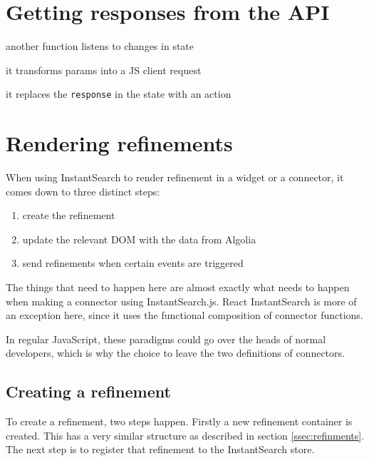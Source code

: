 
\section{Getting responses from the API} %
\label{sec:getting_responses_from_the_api}

another function listens to changes in state %

it transforms params into a JS client request

it replaces the {\tt response} in the state with an action


\section{Rendering refinements} %
\label{sec:rendering_refinements}

When using InstantSearch to render refinement in a widget or a connector, it comes down to three distinct steps:

\begin{enumerate}
  \item create the refinement
  \item update the relevant DOM with the data from Algolia
  \item send refinements when certain events are triggered
\end{enumerate}

The things that need to happen here are almost exactly what needs to happen when making a connector using InstantSearch.js. React InstantSearch is more of an exception here, since it uses the functional composition of connector functions.

In regular JavaScript, these paradigms could go over the heads of normal developers, which is why the choice to leave the two definitions of connectors.

\subsection{Creating a refinement}
\label{subs:creating_a_refinement}

To create a refinement, two steps happen. Firstly a new refinement container is created. This has a very similar structure as described in section \ref{ssec:refinments}. The next step is to register that refinement to the InstantSearch store.

